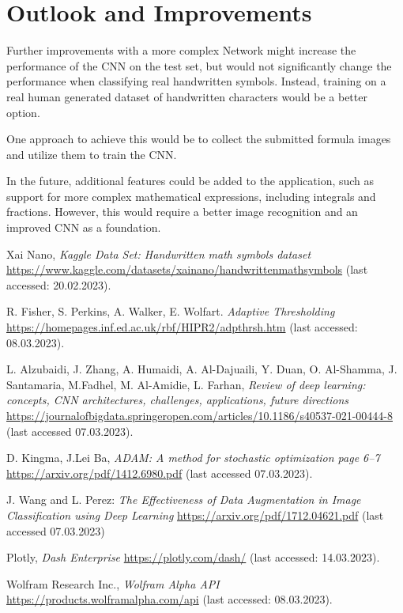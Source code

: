 \documentclass[@CLASSOPTIONS@]{tumarticle}
\begin{document}
\section{Outlook and Improvements}

Further improvements with a more complex Network might increase the performance of the CNN on the test set,
but would not significantly change the performance when classifying real handwritten symbols.
Instead, training on a real human generated dataset of handwritten characters would be a better option.

One approach to achieve this would be to collect the submitted formula images and utilize them to train the CNN\@.

In the future, additional features could be added to the application,
such as support for more complex mathematical expressions, including integrals and fractions.
However, this would require a better image recognition and an improved CNN as a foundation.

\begin{thebibliography}{7}

  Xai Nano,
  \emph{Kaggle Data Set: Handwritten math symbols dataset}
  \url{https://www.kaggle.com/datasets/xainano/handwrittenmathsymbols}
  (last accessed: 20.02.2023).

  R. Fisher, S. Perkins, A. Walker, E. Wolfart.
  \emph{Adaptive Thresholding}
  \url{https://homepages.inf.ed.ac.uk/rbf/HIPR2/adpthrsh.htm}
  (last accessed: 08.03.2023).

  L. Alzubaidi, J. Zhang, A. Humaidi, A. Al-Dajuaili, Y. Duan, O. Al-Shamma, J. Santamaria, M.Fadhel, M. Al-Amidie, L. Farhan,
  \emph{Review of deep learning: concepts, CNN architectures, challenges, applications, future directions}
  \url{https://journalofbigdata.springeropen.com/articles/10.1186/s40537-021-00444-8}
  (last accessed 07.03.2023).

  D. Kingma, J.Lei Ba, \emph{ADAM: A method for stochastic optimization page 6--7}
  \url{https://arxiv.org/pdf/1412.6980.pdf}
  (last accessed 07.03.2023).

  J. Wang and L. Perez: \emph{The Effectiveness of Data Augmentation in Image Classification using Deep Learning}
  \url{https://arxiv.org/pdf/1712.04621.pdf}
  (last accessed 07.03.2023)

  Plotly,
  \emph{Dash Enterprise}
  \url{https://plotly.com/dash/}
  (last accessed: 14.03.2023).

  Wolfram Research Inc.,
  \emph{Wolfram Alpha API}
  \url{https://products.wolframalpha.com/api}
  (last accessed: 08.03.2023).

\end{thebibliography}
\end{document}
